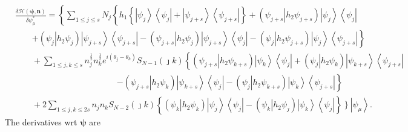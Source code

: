 \documentclass[aps,preprint]{revtex4}%
\begin{document}
\begin{align}
&  \frac{\delta\mathcal{H}\left(  \mathbf{\psi,n}\right)  }{\delta\psi_{\mu
}^{\ast}}=\left\{  \sum_{1\leq j\leq s}N_{j}\left\{  h_{1}\left\{  \left\vert
\psi_{j}\right\rangle \left\langle \psi_{j}\right\vert +\left\vert \psi
_{j+s}\right\rangle \left\langle \psi_{j+s}\right\vert \right\}  +\left(
\left.  \psi_{j+s}\right\vert h_{2}\psi_{j+s}\right)  \left\vert \psi
_{j}\right\rangle \left\langle \psi_{j}\right\vert \right.  \right.
\nonumber\\
&  \qquad\left.  +\left(  \left.  \psi_{j}\right\vert h_{2}\psi_{j}\right)
\left\vert \psi_{j+s}\right\rangle \left\langle \psi_{j+s}\right\vert -\left(
\left.  \psi_{j+s}\right\vert h_{2}\psi_{j}\right)  \left\vert \psi
_{j+s}\right\rangle \left\langle \psi_{j}\right\vert -\left(  \left.  \psi
_{j}\right\vert h_{2}\psi_{j+s}\right)  \left\vert \psi_{j}\right\rangle
\left\langle \psi_{j+s}\right\vert \right\} \nonumber\\
&  \qquad+\sum_{1\leq j,k\leq s}n_{j}^{\frac{1}{2}}n_{k}^{\frac{1}{2}%
}e^{i\left(  \theta_{j}-\theta_{k}\right)  }S_{N-1}\left(  \jmath k\right)
\left\{  \left(  \left.  \psi_{j+s}\right\vert h_{2}\psi_{k+s}\right)
\left\vert \psi_{k}\right\rangle \left\langle \psi_{j}\right\vert +\left(
\left.  \psi_{j}\right\vert h_{2}\psi_{k}\right)  \left\vert \psi
_{k+s}\right\rangle \left\langle \psi_{j+s}\right\vert \right. \nonumber\\
&  \qquad\qquad\qquad\qquad\qquad\qquad\left.  -\left(  \left.  \psi
_{j+s}\right\vert h_{2}\psi_{k}\right)  \left\vert \psi_{k+s}\right\rangle
\left\langle \psi_{j}\right\vert -\left(  \left.  \psi_{j}\right\vert
h_{2}\psi_{k+s}\right)  \left\vert \psi_{k}\right\rangle \left\langle
\psi_{j+s}\right\vert \right\} \nonumber\\
&  \qquad+2\sum_{1\leq j,k\leq2s}n_{j}n_{k}S_{N-2}\left(  \jmath k\right)
\left\{  \left(  \left.  \psi_{k}\right\vert h_{2}\psi_{k}\right)  \left\vert
\psi_{j}\right\rangle \left\langle \psi_{j}\right\vert -\left(  \left.
\psi_{k}\right\vert h_{2}\psi_{j}\right)  \left\vert \psi_{k}\right\rangle
\left\langle \psi_{j}\right\vert \right\}  \left.  \overset{}{}\right\}
\left\vert \psi_{\mu}\right\rangle . \label{der1}%
\end{align}
The derivatives wrt $\mathbf{\psi}$ are
\end{document}
